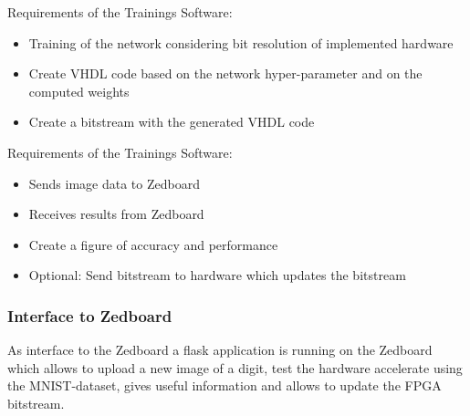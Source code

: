 Requirements of the Trainings Software:
\begin{itemize} 
	\item Training of the network considering bit resolution of implemented hardware
	\item Create VHDL code based on the network hyper-parameter and on the computed weights
	\item Create a bitstream with the generated VHDL code
\end{itemize}

Requirements of the Trainings Software:
\begin{itemize}
	\item Sends image data to Zedboard
	\item Receives results from Zedboard
	\item Create a figure of accuracy and performance   
	\item Optional: Send bitstream to hardware which updates the bitstream 
\end{itemize}

\subsubsection{Interface to Zedboard} \label{subsec:InterfaceRemoteZed}
As interface to the Zedboard a flask application is running on the Zedboard which allows to upload a new image of a digit, test the hardware accelerate using the MNIST-dataset, gives useful information and allows to update the FPGA bitstream. 




